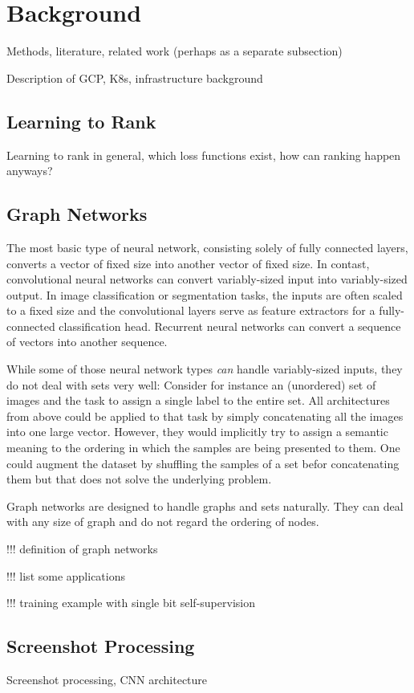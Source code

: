 \section{Background}

Methods, literature, related work (perhaps as a separate subsection)

Description of GCP, K8s, infrastructure background

\subsection{Learning to Rank}
Learning to rank in general, which loss functions exist, how can ranking happen anyways?

\subsection{Graph Networks}
The most basic type of neural network, consisting solely of fully connected layers, converts a vector of fixed size into another vector of fixed size.
In contast, convolutional neural networks can convert variably-sized input into variably-sized output. In image classification or segmentation tasks, the inputs are often scaled to a fixed size and the convolutional layers serve as feature extractors for a fully-connected classification head.
Recurrent neural networks can convert a sequence of vectors into another sequence.

While some of those neural network types \textit{can} handle variably-sized inputs, they do not deal with sets very well: Consider for instance an (unordered) set of images and the task to assign a single label to the entire set. All architectures from above could be applied to that task by simply concatenating all the images into one large vector. However, they would implicitly try to assign a semantic meaning to the ordering in which the samples are being presented to them. One could augment the dataset by shuffling the samples of a set befor concatenating them but that does not solve the underlying problem.

Graph networks are designed to handle graphs and sets naturally. They can deal with any size of graph and do not regard the ordering of nodes.

!!! definition of graph networks

!!! list some applications

!!! training example with single bit self-supervision


\subsection{Screenshot Processing}
Screenshot processing, CNN architecture
